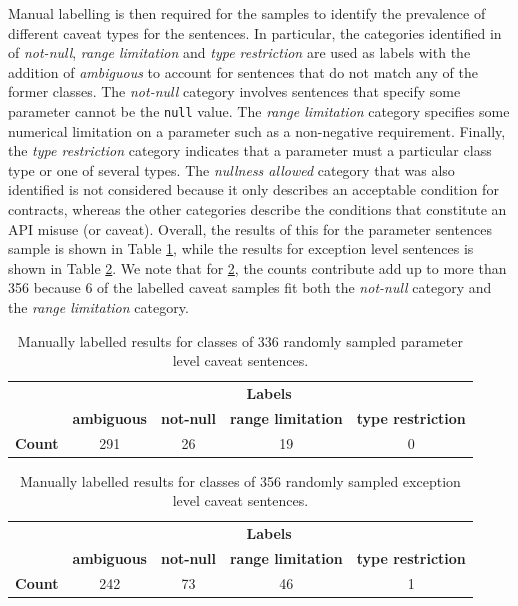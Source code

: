 Manual labelling is then required for the samples to identify the prevalence of different caveat types for the sentences. In  particular, the categories identified in \cite{zhou-directive} of \textit{not-null}, \textit{range limitation} and \textit{type restriction} are used as labels with the addition of \textit{ambiguous} to account for sentences that do not match any of the former classes. The \textit{not-null} category involves sentences that specify some parameter cannot be the \lstinline{null} value. The \textit{range limitation} category specifies some numerical limitation on a parameter such as a non-negative requirement. Finally, the \textit{type restriction} category indicates that a parameter must a particular class type or one of several types. The \textit{nullness allowed} category that was also identified is not considered because it only describes an acceptable condition for contracts, whereas the other categories describe the conditions that constitute an API misuse (or caveat). Overall, the results of this for the parameter sentences sample is shown in Table \ref{tab:caveat-param-stats}, while the results for exception level sentences is shown in Table \ref{tab:caveat-exception-stats}. We note that for \ref{tab:caveat-exception-stats}, the counts contribute add up to more than 356 because 6 of the labelled caveat samples fit both the \textit{not-null} category and the \textit{range limitation} category. 

\begin{table}[h]
	\begin{tabular}{|l|cccc|}
		\hline
		& \multicolumn{4}{c|}{\textbf{Labels}} \\ \cline{2-5} 
		& \textbf{ambiguous} & \textbf{not-null} & \textbf{range limitation} & \textbf{type restriction} \\ \hline
		\textbf{Count} & 291 & 26 & 19 & 0 \\ \hline
	\end{tabular}
	\caption{Manually labelled results for classes of 336 randomly sampled parameter level caveat sentences.}
	\label{tab:caveat-param-stats}
\end{table}

\begin{table}[h]
	\begin{tabular}{|l|cccc|}
		\hline
		& \multicolumn{4}{c|}{\textbf{Labels}} \\ \cline{2-5} 
		& \textbf{ambiguous} & \textbf{not-null} & \textbf{range limitation} & \textbf{type restriction} \\ \hline
		\textbf{Count} & 242 & 73 & 46 & 1 \\ \hline
	\end{tabular}
	\caption{Manually labelled results for classes of 356 randomly sampled exception level caveat sentences.}
	\label{tab:caveat-exception-stats}
\end{table}


